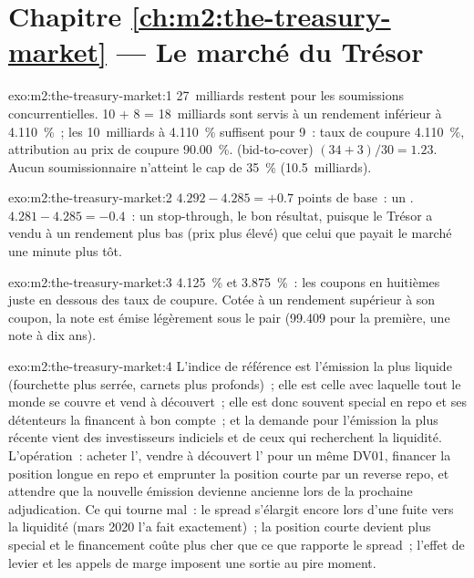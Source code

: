 \section*{Chapitre \ref{ch:m2:the-treasury-market} --- Le marché du Trésor}

\begin{solution}{exo:m2:the-treasury-market:1}
27~milliards restent pour les soumissions concurrentielles. 10 + 8 = 18~milliards sont servis à un rendement inférieur
à 4.110~\%~; les 10~milliards à 4.110~\% suffisent pour 9~: taux de coupure 4.110~\%,
attribution au prix de coupure 90.00~\%.  (bid-to-cover) $(34 + 3)/30 = 1.23$. Aucun soumissionnaire
n'atteint le cap de 35~\% (10.5~milliards).
\end{solution}

\begin{solution}{exo:m2:the-treasury-market:2}
$4.292 - 4.285 = +0.7$ points de base~: un . $4.281 - 4.285 = -0.4$~: un stop-through,
le bon résultat, puisque le Trésor a vendu à un rendement plus bas (prix plus élevé)
que celui que payait le marché une minute plus tôt.
\end{solution}

\begin{solution}{exo:m2:the-treasury-market:3}
4.125~\% et 3.875~\%~: les coupons en huitièmes juste en dessous des taux de coupure. Cotée à un
rendement supérieur à son coupon, la note est émise légèrement sous le pair (99.409 pour la
première, une note à dix ans).
\end{solution}

\begin{solution}{exo:m2:the-treasury-market:4}
L'indice de référence est l'émission la plus liquide (fourchette plus serrée, carnets plus profonds)~; elle est
celle avec laquelle tout le monde se couvre et vend à découvert~; elle est donc souvent special en repo et
ses détenteurs la financent à bon compte~; et la demande pour l'émission la plus récente vient des investisseurs
indiciels et de ceux qui recherchent la liquidité. L'opération~: acheter l',
vendre à découvert l' pour un même DV01, financer la position longue en repo et emprunter la
position courte par un reverse repo, et attendre que la nouvelle émission devienne ancienne lors de la
prochaine adjudication. Ce qui tourne mal~: le spread s'élargit encore lors d'une fuite vers la
liquidité (mars 2020 l'a fait exactement)~; la position courte devient plus special et le
financement coûte plus cher que ce que rapporte le spread~; l'effet de levier et les appels de marge imposent une sortie
au pire moment.
\end{solution}

